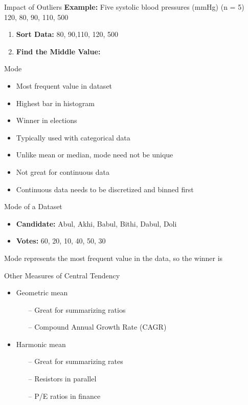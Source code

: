 \begin{frame}[t]{Impact of Outliers}
	\textbf{Example:} Five systolic blood pressures (mmHg) (n = 5) \\ 
	120, 80, 90, 110, 500 \pause 
		\begin{enumerate}
		\item \textbf{Sort Data:}  80, 90,110, 120, 500  \pause 
		\item \textbf{Find the Middle Value:}  
	\end{enumerate}
\end{frame}

\begin{frame}[t]{Mode}
	\begin{itemize}
		\item Most frequent value in dataset
		\item Highest bar in histogram
		\item Winner in elections
		\item Typically used with categorical data
		\item Unlike mean or median, mode need not
		be unique
		\item Not great for continuous data
		\item Continuous data needs to be discretized
		and binned first
	\end{itemize}
\end{frame}

\begin{frame}[t]{Mode of a Dataset}
\begin{itemize}
	\item \textbf{Candidate:} Abul, Akhi, Babul, Bithi, Dabul, Doli
	\item \textbf{Votes:} 60, 20, 10, 40, 50, 30
\end{itemize} 
Mode represents the most frequent value in the data, so the winner is 

\end{frame}

\begin{frame}[t]{Other Measures of Central Tendency}
	\begin{itemize}
		\item Geometric mean
		\begin{itemize}
			\item[--] Great for summarizing ratios
			\item[--] Compound Annual Growth Rate
			(CAGR)
		\end{itemize}
	\end{itemize}

\begin{itemize}
	\item Harmonic mean
	\begin{itemize}
		\item[--] Great for summarizing rates
		\item[--] Resistors in parallel
		\item[--] P/E ratios in finance
	\end{itemize}
\end{itemize}
\end{frame}


